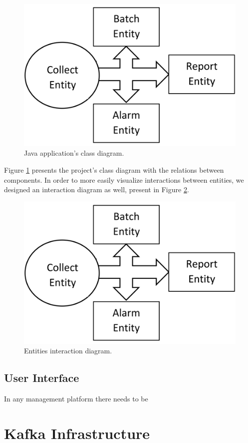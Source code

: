 \documentclass[12pt]{article}
\begin{document}
\begin{figure}[H]
  \centering
  \begin{minipage}{\textwidth}
    \centering
    \includegraphics[width=.5\linewidth]{img/BlockDiagram.png}
  \end{minipage}%
  \caption{Java application's class diagram.}
  \label{ClassDiagram}
\end{figure} 

Figure \ref{ClassDiagram} presents the project's class diagram with the relations between components.
In order to more easily visualize interactions between entities, we designed an interaction diagram as well, present in Figure \ref{InteractionDiagram}.

\begin{figure}[H]
  \centering
  \begin{minipage}{\textwidth}
    \centering
    \includegraphics[width=.5\linewidth]{img/BlockDiagram.png}
  \end{minipage}%
  \caption{Entities interaction diagram.}
  \label{InteractionDiagram}
\end{figure} 

\subsection{User Interface} %

In any management platform there needs to be  

\newpage
\section{Kafka Infrastructure} \label{infrastructure} %
\end{document}
